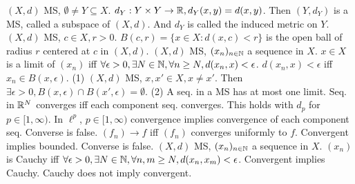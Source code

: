 $(X,d)$ MS, $\emptyset \neq Y \subseteq X$.
$d_Y: Y \times Y \to \mathbb{R}, d_Y(x,y) = d(x,y)$.
Then $(Y,d_Y)$ is a MS, called a subspace of $(X,d)$.
And $d_Y$ is called the induced metric on $Y$.
$(X,d)$ MS, $c \in X, r > 0$.
$B(c,r) = \{x \in X: d(x,c) < r\}$ is the open ball of radius $r$ centered at $c$ in $(X,d)$.
$(X,d)$ MS, $(x_n)_{n \in \mathbb{N}}$ a sequence in $X$.
$x \in X$ is a limit of $(x_n)$ iff
$\forall \epsilon > 0, \exists N \in \mathbb{N}, \forall n \geq N, d(x_n,x) < \epsilon$.
$d(x_n,x) < \epsilon$ iff $x_n \in B(x,\epsilon)$.
(1) $(X,d)$ MS, $x, x' \in X, x \neq x'$.
Then $\exists \epsilon > 0, B(x,\epsilon) \cap B(x',\epsilon) = \emptyset$.
(2) A seq. in a MS has at most one limit.
 Seq. in $\mathbb{R}^N$ converges iff each component seq. converges.
This holds with $d_p$ for $p \in [1,\infty)$.
 In $\ell^p$, $p \in [1,\infty)$
convergence implies convergence of each component seq.
Converse is false.
$(f_n) \to f$ iff $(f_n)$ converges uniformly to $f$.
 Convergent implies bounded.
Converse is false.
$(X,d)$ MS, $(x_n)_{n \in \mathbb{N}}$ a sequence in $X$.
$(x_n)$ is Cauchy iff
$\forall \epsilon > 0, \exists N \in \mathbb{N}, \forall n,m \geq N, d(x_n,x_m) < \epsilon$.
 Convergent implies Cauchy.
Cauchy does not imply convergent.
